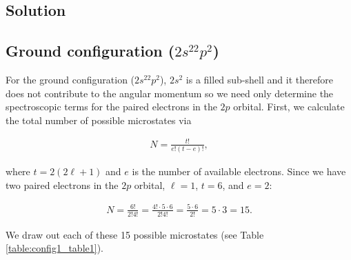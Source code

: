 \documentclass[12pt]{article}
\begin{document}

\subsection*{Solution}

\subsection*{Ground configuration ($2s^22p^2$)}

For the ground configuration ($2s^22p^2$), $2s^2$ is a filled sub-shell and it therefore does not contribute to the angular momentum so we need only determine the spectroscopic terms for the paired electrons in the $2p$ orbital. First, we calculate the total number of possible microstates via

\begin{align*}
N = \frac{t!}{e!(t-e)!},
\end{align*}

where $t = 2(2\ell+1)$ and $e$ is the number of available electrons. Since we have two paired electrons in the $2p$ orbital, $\ell=1$, $t=6$, and $e=2$:

\begin{align*}
N = \frac{6!}{2!4!} = \frac{4!\cdot5\cdot6}{2!4!} = \frac{5\cdot6}{2!} = 5\cdot3 = 15.
\end{align*}

We draw out each of these 15 possible microstates (see Table \ref{table:config1_table1}).
\end{document}
